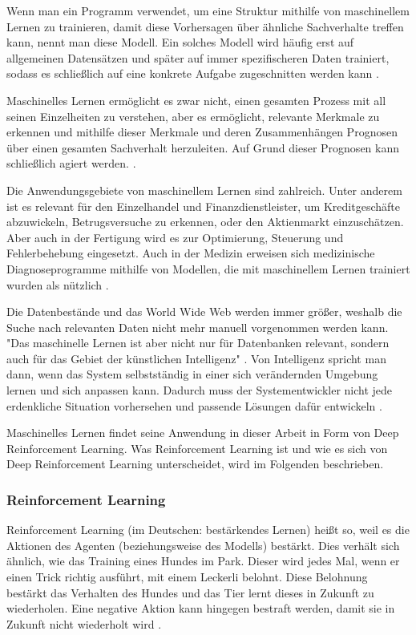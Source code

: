 Wenn man ein Programm verwendet, um eine Struktur mithilfe von maschinellem Lernen zu trainieren, damit diese Vorhersagen über ähnliche Sachverhalte treffen kann, nennt man diese Modell. Ein solches Modell wird häufig erst auf allgemeinen Datensätzen und später auf immer spezifischeren Daten trainiert, sodass es schließlich auf eine konkrete Aufgabe zugeschnitten werden kann \cite[S. 1f]{alpaydin_maschinelles_2022}.

Maschinelles Lernen ermöglicht es zwar nicht, einen gesamten Prozess mit all seinen Einzelheiten zu verstehen, aber es ermöglicht, relevante Merkmale zu erkennen und mithilfe dieser Merkmale und deren Zusammenhängen Prognosen über einen gesamten Sachverhalt herzuleiten. Auf Grund dieser Prognosen kann schließlich agiert werden. \cite[S. 2]{alpaydin_maschinelles_2022}.

Die Anwendungsgebiete von maschinellem Lernen sind zahlreich. Unter anderem ist es relevant für den Einzelhandel und Finanzdienstleister, um Kreditgeschäfte abzuwickeln, Betrugsversuche zu erkennen, oder den Aktienmarkt einzuschätzen. Aber auch in der Fertigung wird es zur Optimierung, Steuerung und Fehlerbehebung eingesetzt. Auch in der Medizin erweisen sich medizinische Diagnoseprogramme mithilfe von Modellen, die mit maschinellem Lernen trainiert wurden als nützlich \cite[S. 3]{alpaydin_maschinelles_2022}.

Die Datenbestände und das World Wide Web werden immer größer, weshalb die Suche nach relevanten Daten nicht mehr manuell vorgenommen werden kann. "Das maschinelle Lernen ist aber nicht nur für Datenbanken relevant, sondern auch für das Gebiet der künstlichen Intelligenz" \cite[S. 3]{alpaydin_maschinelles_2022}. Von Intelligenz spricht man dann, wenn das System selbstständig in einer sich verändernden Umgebung lernen und sich anpassen kann. Dadurch muss der Systementwickler nicht jede erdenkliche Situation vorhersehen und passende Lösungen dafür entwickeln \cite[S. 3]{alpaydin_maschinelles_2022}.
 
Maschinelles Lernen findet seine Anwendung in dieser Arbeit in Form von Deep Reinforcement Learning. Was Reinforcement Learning ist und wie es sich von Deep Reinforcement Learning unterscheidet, wird im Folgenden beschrieben.
\subsubsection{Reinforcement Learning}
Reinforcement Learning (im Deutschen: bestärkendes Lernen) heißt so, weil es die Aktionen des Agenten (beziehungsweise des Modells) bestärkt. Dies verhält sich ähnlich, wie das Training eines Hundes im Park. Dieser wird jedes Mal, wenn er einen Trick richtig ausführt, mit einem Leckerli belohnt. Diese Belohnung bestärkt das Verhalten des Hundes und das Tier lernt dieses in Zukunft zu wiederholen. Eine negative Aktion kann hingegen bestraft werden, damit sie in Zukunft nicht wiederholt wird \cite[S. 11]{ris-ala_fundamentals_2023}.

